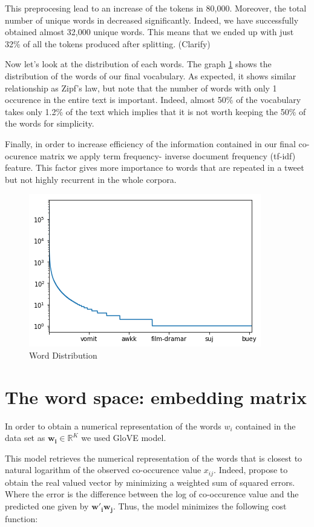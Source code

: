 \documentclass[10pt,conference,compsocconf]{IEEEtran}
\begin{document}
This preprocesing lead to an increase of the tokens in 80,000. Moreover, the total number of unique words in decreased significantly. Indeed, we have successfully obtained almost 32,000 unique words. This means that we ended up with just 32\% of all the tokens produced after splitting. (Clarify)

Now let's look at the distribution of each words. The graph \ref{fig1} shows the distribution of the words of our final vocabulary. As expected, it shows similar relationship as Zipf's law, but note that the number of words with only 1 occurence in the entire text is important. Indeed, almost 50\% of the vocabulary takes only 1.2\% of the text which implies that it is not worth keeping the 50\% of the words for simplicity.

Finally, in order to increase efficiency of the information contained in our final co-ocurence matrix we apply term frequency- inverse document frequency (tf-idf) feature. This factor gives more importance to words that are repeated in a tweet but not highly recurrent in the whole corpora.  

\begin{tiny}
		\begin{figure}[b] \label{fig1}
			\includegraphics[scale=0.5]{WordDistribution.png}   
			\caption{Word Distribution }
			\label{fig1}    
		\end{figure}
\end{tiny}

\section{The word space: embedding matrix }\label{s2}
\label{S1}
In order to obtain a numerical representation of the words $w_i$ contained in the data set  as $\textbf{w}_{\textbf{i}} \in \mathbb{R}^K$ we used GloVE model. 

This model retrieves the numerical representation of the words that is closest to natural logarithm of the observed co-occurence value $x_{ij}$. Indeed,  \cite{pennington2014glove} propose to obtain the real valued vector by minimizing a weighted sum of squared errors. Where the error is the difference between the log of co-occurence value and the predicted one given by $\textbf{w}'_{\textbf{i}}\textbf{w}_{\textbf{j}}$. Thus, the model minimizes the following cost function: 
\end{document}
